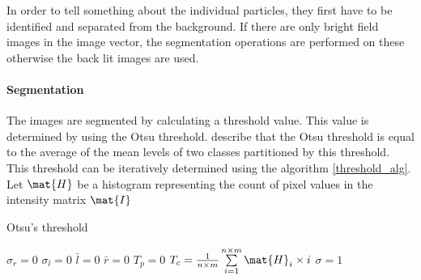 In order to tell something about the individual particles, they first have to be identified and separated from the background. If there are only bright field images in the image vector, the segmentation operations are performed on these otherwise the back lit images are used. 

\paragraph{Segmentation}
The images are segmented by calculating a threshold value. This value is determined by using the Otsu threshold. \citeauthor{Xu2011956} describe that the Otsu threshold is equal to the average of the mean levels of two classes partitioned by this threshold. This threshold can be iteratively determined using the algorithm \ref{threshold_alg}. Let $\mat{H}$ be a histogram representing the count of pixel values in the intensity matrix $\mat{I}$
\begin{algorithm}\label{threshold_alg}
	\caption{Otsu's threshold}
	\begin{algorithmic}[1]
		\Statex
		\State $\sigma_r=0$
		\State $\sigma_l=0$
		\State $\bar{l}=0$
		\State $\bar{r}=0$
		\State $T_p=0$
		\State $T_c=\frac{1}{n \times m} \sum\limits_{i=1}^{n \times m} \mat{H}_{i} \times i$
			\State $\sigma=1$
		\EndWhile
	
		\State \Return{$\delta$}
		\EndFunction
	\end{algorithmic}
\end{algorithm}
